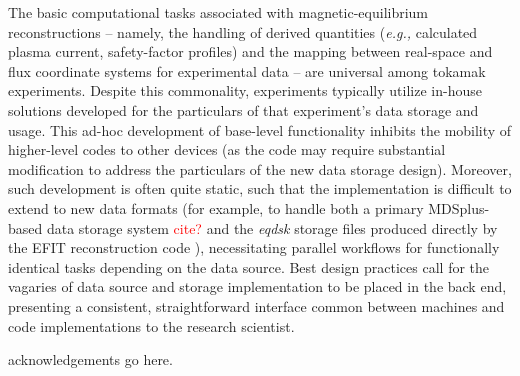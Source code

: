 \documentclass[12pt,floatfix,showpacs]{revtex4-1}
\newcommand{\eg}{\emph{e.g., }}
\newcommand{\note}[1]{\textcolor{red}{#1}}
\begin{document}
The basic computational tasks associated with magnetic-equilibrium reconstructions -- namely, the handling of derived quantities (\eg calculated plasma current, safety-factor profiles) and the mapping between real-space and flux coordinate systems for experimental data -- are universal among tokamak experiments.  Despite this commonality, experiments typically utilize in-house solutions developed for the particulars of that experiment's data storage and usage.  This ad-hoc development of base-level functionality inhibits the mobility of higher-level codes to other devices (as the code may require substantial modification to address the particulars of the new data storage design).  Moreover, such development is often quite static, such that the implementation is difficult to extend to new data formats (for example, to handle both a primary MDSplus-based data storage system \note{cite?} and the \emph{eqdsk} storage files produced directly by the EFIT reconstruction code \cite{Lao1985}), necessitating parallel workflows for functionally identical tasks depending on the data source.  Best design practices call for the vagaries of data source and storage implementation to be placed in the back end, presenting a consistent, straightforward interface common between machines and code implementations to the research scientist.




\begin{acknowledgements}
 acknowledgements go here.
\end{acknowledgements}



\end{document}
